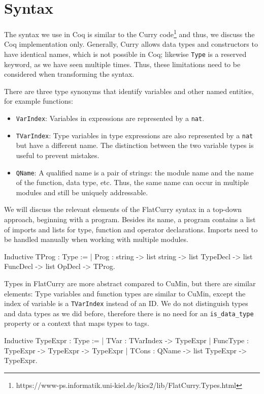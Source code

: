\documentclass[paper = a4, fleqn, twoside]{scrreprt}
\newcommand{\coqinline}[1]{\texttt{#1}}
\begin{document}
\section{Syntax}
\label{flatcurrysyntax}
The syntax we use in Coq is similar to the Curry code\footnote{https://www-ps.informatik.uni-kiel.de/kics2/lib/FlatCurry.Types.html} and thus, we discuss the Coq implementation only. Generally, Curry allows data types and constructors to have identical names, which is not possible in Coq; likewise \texttt{Type} is a reserved keyword, as we have seen multiple times. Thus, these limitations need to be considered when transforming the syntax.
\par \noindent
There are three type synonyms that identify variables and other named entities, for example functions:
\begin{itemize}
	\item \coqinline{VarIndex}: Variables in expressions are represented by a \coqinline{nat}.
	\item \coqinline{TVarIndex}: Type variables in type expressions are also represented by a \coqinline{nat} but have a different name. The distinction between the two variable types is useful to prevent mistakes.
	\item \coqinline{QName}: A qualified name is a pair of strings: the module name and the name of the function, data type, etc. Thus, the same name can occur in multiple modules and still be uniquely addressable.
\end{itemize}
We will discuss the relevant elements of the FlatCurry syntax in a top-down approach, beginning with a program. Besides its name, a program contains a list of imports and lists for type, function and operator declarations. Imports need to be handled manually when working with multiple modules.
\begin{coqcode}
Inductive TProg : Type := 
  | Prog : string -> list string ->
           list TypeDecl -> list FuncDecl -> list OpDecl -> TProg.
\end{coqcode}
Types in FlatCurry are more abstract compared to CuMin, but there are similar elements: Type variables and function types are similar to CuMin, except the index of variable is a \texttt{TVarIndex} instead of an ID. We do not distinguish types and data types as we did before, therefore there is no need for an \texttt{is\_data\_type} property or a context that maps types to tags.
\begin{coqcode}
Inductive TypeExpr : Type :=
  | TVar     : TVarIndex -> TypeExpr
  | FuncType : TypeExpr  -> TypeExpr      -> TypeExpr
  | TCons    : QName     -> list TypeExpr -> TypeExpr.
\end{coqcode}
\end{document}
